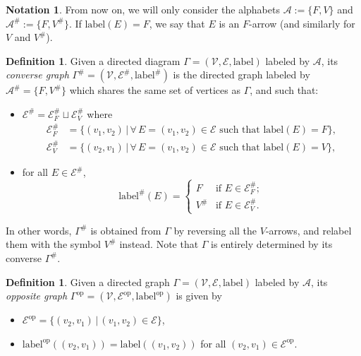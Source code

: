 \documentclass[12pt]{amsart}
\theoremstyle{definition}
\newtheorem{definition}[theorem]{Definition}
\newtheorem{notation}[theorem]{Notation}
\newcommand{\<}{\langle}   %
\renewcommand{\>}{\rangle} %
\begin{document}
\begin{notation}
    From now on, we will only consider the alphabets $\mathcal A := \{F,V\}$ and $\mathcal A^{\#} := \{F,V^{\#}\}$. If $\mathrm{label}(E) = F$, we say that $E$ is an $F$-arrow (and similarly for $V$ and $V^{\#}$).
\end{notation}

\begin{definition}\label{DefinitionConverseGraph}
    Given a directed diagram $\Gamma= (\mathcal V, \mathcal E, \mathrm{label})$ labeled by $\mathcal A$, its \textit{converse graph} $\Gamma^{\#} = (\mathcal V, \mathcal E^{\#}, \mathrm{label}^{\#})$ is the directed graph labeled by $\mathcal A^{\#} = \{F,V^{\#}\}$ which shares the same set of vertices as $\Gamma$, and such that:
    \begin{itemize}
        \item $\mathcal E^{\#} = \mathcal E^{\#}_F \sqcup \mathcal E^{\#}_{V}$ where 
        \begin{align*}
            \mathcal E^{\#}_F & = \{(v_1,v_2) \,|\, \forall\, E = (v_1,v_2) \in \mathcal E \text{ such that } \mathrm{label}(E) = F\},\\
            \mathcal E^{\#}_{V} &= \{(v_2,v_1) \,|\, \forall\, E = (v_1,v_2) \in \mathcal E \text{ such that } \mathrm{label}(E) = V\},
        \end{align*}
        \item for all $E \in \mathcal E^{\#}$, 
        \begin{equation*}
            \mathrm{label}^{\#}(E) = \begin{cases}
                F & \text{if } E \in \mathcal E^{\#}_F;\\
                V^{\#} & \text{if } E \in \mathcal E^{\#}_V.
            \end{cases}
        \end{equation*}
    \end{itemize}
\end{definition}

In other words, $\Gamma^{\#}$ is obtained from $\Gamma$ by reversing all the $V$-arrows, and relabel them with the symbol $V^{\#}$ instead. Note that $\Gamma$ is entirely determined by its converse $\Gamma^{\#}$.

\begin{definition}\label{DefinitionOppositeGraph}
    Given a directed graph $\Gamma= (\mathcal V, \mathcal E, \mathrm{label})$ labeled by $\mathcal A$, its \textit{opposite graph} $\Gamma^{\mathrm{op}} = (\mathcal V, \mathcal E^{\mathrm{op}}, \mathrm{label}^{\mathrm{op}})$ is given by 
    \begin{itemize}
        \item $\mathcal E^{\mathrm{op}} = \{(v_2,v_1) \,|\, (v_1,v_2) \in \mathcal E\}$,
        \item $\mathrm{label}^{\mathrm{op}}((v_2,v_1)) = \mathrm{label}((v_1,v_2))$ for all $(v_2,v_1) \in \mathcal E^{\mathrm{op}}$.
    \end{itemize}
\end{definition}
\end{document}
